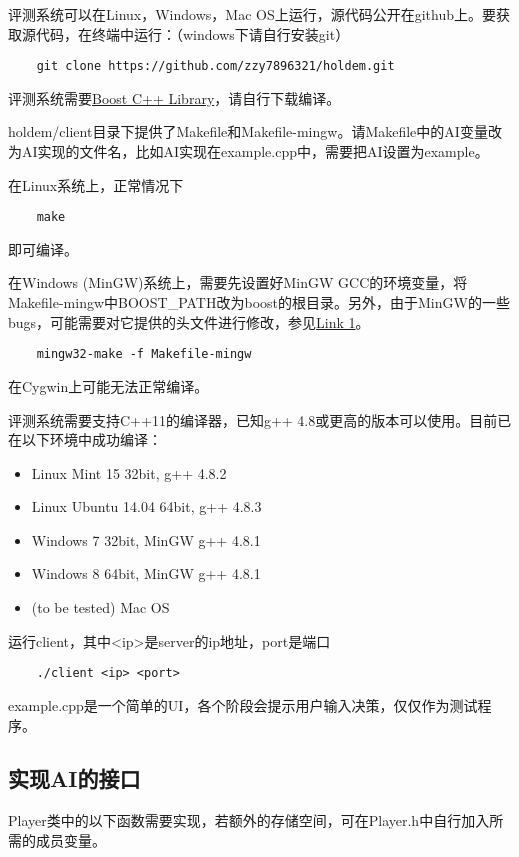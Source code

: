 \documentclass[11pt, fleqn, a4paper]{article}
\begin{document}
评测系统可以在Linux，Windows，Mac OS上运行，源代码公开在github上。要获取源代码，在终端中运行：（windows下请自行安装git）

\begin{lstlisting}
	git clone https://github.com/zzy7896321/holdem.git
\end{lstlisting}

评测系统需要\href{http://www.boost.org/}{Boost C++ Library}，请自行下载编译。

holdem/client目录下提供了Makefile和Makefile-mingw。请Makefile中的AI变量改为AI实现的文件名，比如AI实现在example.cpp中，需要把AI设置为example。

在Linux系统上，正常情况下
\begin{lstlisting}
	make
\end{lstlisting}
即可编译。

在Windows (MinGW)系统上，需要先设置好MinGW GCC的环境变量，将Makefile-mingw中BOOST\_PATH改为boost的根目录。另外，由于MinGW的一些bugs，可能需要对它提供的头文件进行修改，参见\href{http://stackoverflow.com/questions/20957727/boostasio-unregisterwaitex-has-not-been-declared}{Link 1}。
\begin{lstlisting}
	mingw32-make -f Makefile-mingw
\end{lstlisting}
在Cygwin上可能无法正常编译。

评测系统需要支持C++11的编译器，已知g++ 4.8或更高的版本可以使用。目前已在以下环境中成功编译：
\begin{itemize}
	\item Linux Mint 15 32bit, g++ 4.8.2
	\item Linux Ubuntu 14.04 64bit, g++ 4.8.3
	\item Windows 7 32bit, MinGW g++ 4.8.1
	\item Windows 8 64bit, MinGW g++ 4.8.1
	\item (to be tested) Mac OS
\end{itemize}

运行client，其中<ip>是server的ip地址，port是端口
\begin{lstlisting}
	./client <ip> <port>
\end{lstlisting}

example.cpp是一个简单的UI，各个阶段会提示用户输入决策，仅仅作为测试程序。

\subsection{实现AI的接口}

Player类中的以下函数需要实现，若额外的存储空间，可在Player.h中自行加入所需的成员变量。
\end{document}
